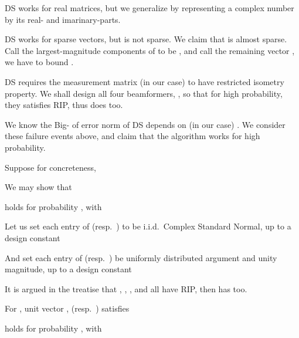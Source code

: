 {
\I DS works for real matrices, but we generalize by representing a complex number by its real- and imarinary-parts.

\I DS works for sparse vectors, but  is not sparse.
We claim that  is almost sparse.
Call the largest-magnitude  components of  to be , and call the remaining vector , we have to bound .
}
{
\I DS requires the measurement matrix (in our case)  to have restricted isometry property.
We shall design all four beamformers, , so that for high probability, they satisfies RIP, thus  does too.

\I We know the Big- of error norm of DS depends on (in our case) .
We consider these failure events above, and claim that the algorithm works for high probability.
}
{
\I Suppose for concreteness,

\I We may show that 

\I holds for probability , with
}
{
\I Let us set each entry of  (resp.\ ) to be i.i.d.\ Complex Standard Normal, up to a design constant

\I And set each entry of  (resp.\ ) be uniformly distributed argument and unity magnitude, up to a design constant

\I It is argued in the treatise that , , , and  all have RIP, then  has too.
}
{
\I For , unit vector ,  (resp.\ ) satisfies
%

\I holds for probability , with
}
